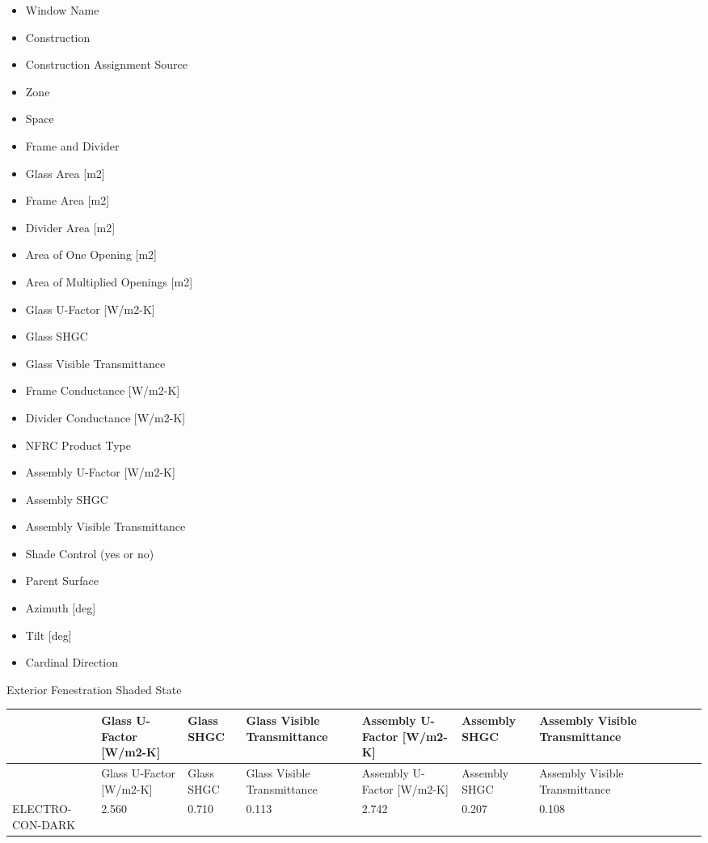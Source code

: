 \begin{itemize}
\item
  Window Name
\item
  Construction
\item
  Construction Assignment Source
\item
  Zone
\item
  Space
\item
  Frame and Divider
\item
  Glass Area [m2]
\item
  Frame Area [m2]
\item
  Divider Area [m2]
\item
  Area of One Opening [m2]
\item
  Area of Multiplied Openings [m2]
\item
  Glass U-Factor [W/m2-K]
\item
  Glass SHGC
\item
  Glass Visible Transmittance
\item
  Frame Conductance [W/m2-K]
\item
  Divider Conductance [W/m2-K]
\item
  NFRC Product Type
\item
  Assembly U-Factor [W/m2-K]
\item
  Assembly SHGC
\item
  Assembly Visible Transmittance
\item
  Shade Control (yes or no)
\item
  Parent Surface
\item
  Azimuth [deg]
\item
  Tilt [deg]
\item
  Cardinal Direction
\end{itemize}



Exterior Fenestration Shaded State


{\scriptsize
\begin{longtable}[c]{>{\raggedright}p{0.5in}>{\raggedright}p{0.5in}>{\raggedright}p{0.5in}>{\raggedright}p{0.5in}>{\raggedright}p{0.5in}>{\raggedright}p{0.5in}>{\raggedright}p{0.5in}>{\raggedright}p{0.5in}>{\raggedright}p{0.5in}>{\raggedright}p{0.5in}>{\raggedright}p{0.5in}}
\toprule
~ & Glass U-Factor [W/m2-K] & Glass SHGC & Glass Visible Transmittance & Assembly U-Factor [W/m2-K] & Assembly SHGC & Assembly Visible Transmittance \tabularnewline
\midrule
\endfirsthead

\toprule
~ & Glass U-Factor [W/m2-K] & Glass SHGC & Glass Visible Transmittance & Assembly U-Factor [W/m2-K] & Assembly SHGC & Assembly Visible Transmittance \tabularnewline
\midrule
\endhead

ELECTRO-CON-DARK & 2.560 & 0.710 & 0.113 & 2.742 & 0.207 & 0.108 \tabularnewline

\bottomrule
\end{longtable}}

